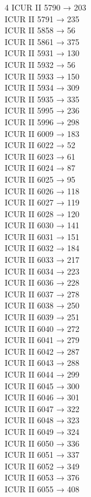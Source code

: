 \begin{multicols}{4}
ICUR II 5790 → 203\\
ICUR II 5791 → 235\\
ICUR II 5858 → 56\\
ICUR II 5861 → 375\\
ICUR II 5931 → 130\\
ICUR II 5932 → 56\\
ICUR II 5933 → 150\\
ICUR II 5934 → 309\\
ICUR II 5935 → 335\\
ICUR II 5995 → 236\\
ICUR II 5996 → 298\\
ICUR II 6009 → 183\\
ICUR II 6022 → 52\\
ICUR II 6023 → 61\\
ICUR II 6024 → 87\\
ICUR II 6025 → 95\\
ICUR II 6026 → 118\\
ICUR II 6027 → 119\\
ICUR II 6028 → 120\\
ICUR II 6030 → 141\\
ICUR II 6031 → 151\\
ICUR II 6032 → 184\\
ICUR II 6033 → 217\\
ICUR II 6034 → 223\\
ICUR II 6036 → 228\\
ICUR II 6037 → 278\\
ICUR II 6038 → 250\\
ICUR II 6039 → 251\\
ICUR II 6040 → 272\\
ICUR II 6041 → 279\\
ICUR II 6042 → 287\\
ICUR II 6043 → 288\\
ICUR II 6044 → 299\\
ICUR II 6045 → 300\\
ICUR II 6046 → 301\\
ICUR II 6047 → 322\\
ICUR II 6048 → 323\\
ICUR II 6049 → 324\\
ICUR II 6050 → 336\\
ICUR II 6051 → 337\\
ICUR II 6052 → 349\\
ICUR II 6053 → 376\\
ICUR II 6055 → 408\\

\end{multicols}
